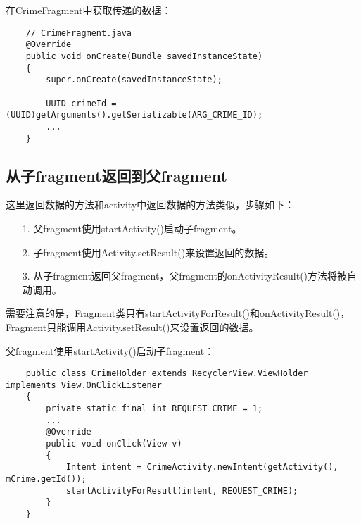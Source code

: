 \documentclass[a4paper,left=2.5cm,right=2.5cm,11pt]{article}
\begin{document}
	在CrimeFragment中获取传递的数据：
	\begin{lstlisting}
	// CrimeFragment.java
	@Override
	public void onCreate(Bundle savedInstanceState)
	{
		super.onCreate(savedInstanceState);

		UUID crimeId = (UUID)getArguments().getSerializable(ARG_CRIME_ID);
		...
	}
	\end{lstlisting}

\subsection{从子fragment返回到父fragment}
	这里返回数据的方法和activity中返回数据的方法类似，步骤如下：
	\begin{itemize}
		\item[1.] 父fragment使用startActivity()启动子fragment。
		\item[2.] 子fragment使用Activity.setResult()来设置返回的数据。
		\item[3.] 从子fragment返回父fragment，父fragment的onActivityResult()方法将被自动调用。
	\end{itemize}

	需要注意的是，Fragment类只有startActivityForResult()和onActivityResult()，Fragment只能调用Activity.setResult()来设置返回的数据。\par

	父fragment使用startActivity()启动子fragment：
	\begin{lstlisting}
	public class CrimeHolder extends RecyclerView.ViewHolder implements View.OnClickListener
	{
		private static final int REQUEST_CRIME = 1;
		...
		@Override
		public void onClick(View v)
		{
			Intent intent = CrimeActivity.newIntent(getActivity(), mCrime.getId());
			startActivityForResult(intent, REQUEST_CRIME);
		}
	}
	\end{lstlisting}
\end{document}
